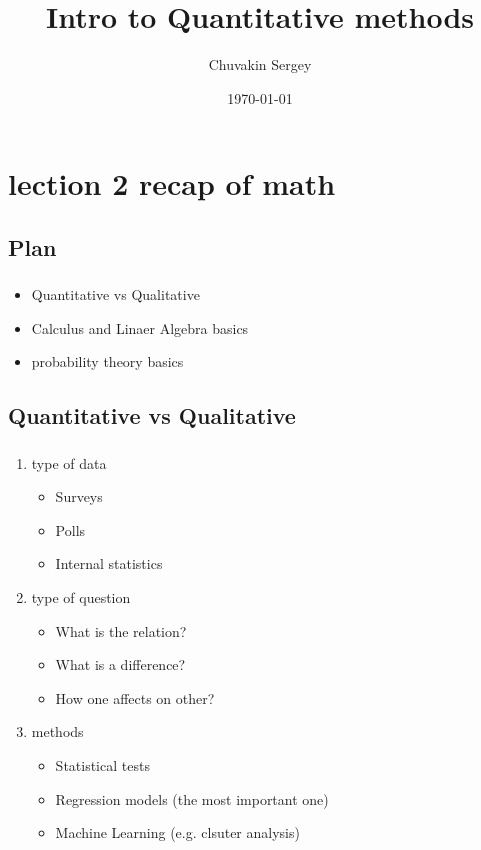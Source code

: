 \documentclass[t, 11pt]{beamer}
\title{Intro to Quantitative methods}
\subtitle{}
\author{Chuvakin Sergey}
\date{\today}
\institute[<<Anthropology>>]{<<School of Advanced Studies>>}
\begin{document}
	
	\frame[plain]{\titlepage}
	\section{lection 2 recap of math}
	
	
	\subsection{Plan}
	\begin{frame} 
		\frametitle{\insertsection} 
		\frametitle{\insertsubsection} 
		\begin{itemize}
   			\item Quantitative vs Qualitative
   			\item Calculus and Linaer Algebra basics 
   			\item probability theory basics
		\end{itemize}
	\end{frame}
	
\subsection{Quantitative vs Qualitative}
	\begin{frame} 
	\frametitle{\insertsection} 
	\frametitle{\insertsubsection} 
	\begin{enumerate}
		\item type of data
			\begin{itemize}
				\item Surveys 
				\item Polls
				\item Internal statistics
			\end{itemize}
		\item type of question 
		\begin{itemize}
			\item What is the relation?
			\item What is a difference?
			\item How one affects on other?
		\end{itemize}
		\item methods
			\begin{itemize}
				\item Statistical tests 
				\item Regression models (the most important one)
				\item Machine Learning (e.g. clsuter analysis)
			\end{itemize}
	\end{enumerate}
\end{frame}
\end{document}
